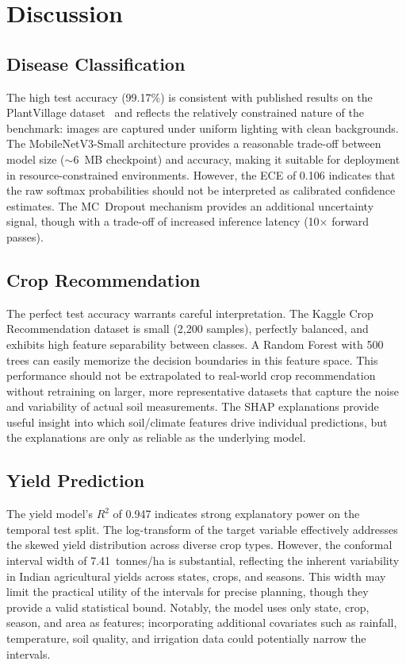 \documentclass[conference]{IEEEtran}
\begin{document}
\section{Discussion}
\label{sec:discussion}

\subsection{Disease Classification}
The high test accuracy (99.17\%) is consistent with published results on the PlantVillage dataset~\cite{mohanty2016using} and reflects the relatively constrained nature of the benchmark: images are captured under uniform lighting with clean backgrounds. The MobileNetV3-Small architecture provides a reasonable trade-off between model size (${\sim}$6~MB checkpoint) and accuracy, making it suitable for deployment in resource-constrained environments. However, the ECE of 0.106 indicates that the raw softmax probabilities should not be interpreted as calibrated confidence estimates. The MC~Dropout mechanism provides an additional uncertainty signal, though with a trade-off of increased inference latency (10$\times$ forward passes).

\subsection{Crop Recommendation}
The perfect test accuracy warrants careful interpretation. The Kaggle Crop Recommendation dataset is small (2,200 samples), perfectly balanced, and exhibits high feature separability between classes. A Random Forest with 500 trees can easily memorize the decision boundaries in this feature space. This performance should not be extrapolated to real-world crop recommendation without retraining on larger, more representative datasets that capture the noise and variability of actual soil measurements. The SHAP explanations provide useful insight into which soil/climate features drive individual predictions, but the explanations are only as reliable as the underlying model.

\subsection{Yield Prediction}
The yield model's $R^{2}$ of 0.947 indicates strong explanatory power on the temporal test split. The log-transform of the target variable effectively addresses the skewed yield distribution across diverse crop types. However, the conformal interval width of 7.41~tonnes/ha is substantial, reflecting the inherent variability in Indian agricultural yields across states, crops, and seasons. This width may limit the practical utility of the intervals for precise planning, though they provide a valid statistical bound. Notably, the model uses only state, crop, season, and area as features; incorporating additional covariates such as rainfall, temperature, soil quality, and irrigation data could potentially narrow the intervals.
\end{document}
